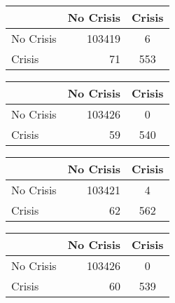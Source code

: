 \begin{table}
    \begin{center}
        \begin{subtable}[c]{0.4\textwidth}
            \begin{tabular}{lrc}
                \hline
                 & No Crisis & Crisis \\
                \hline
                No Crisis & 103419 & 6 \\
                Crisis & 71 & 553\\
                \hline
            \end{tabular}
            \label{tab:mat-conf-raw-1.1}
        \end{subtable}
        \hspace{1em}\vspace{1em}
        \begin{subtable}[c]{0.4\textwidth}
                \begin{tabular}{lrc}
                \hline
                 & No Crisis & Crisis \\
                \hline
                No Crisis & 103426 & 0 \\
                Crisis & 59 & 540\\
                \hline
            \end{tabular}
            \label{tab:mat-conf-stats-1.1}
        \end{subtable}
        
        \begin{subtable}[c]{0.4\textwidth}
            \begin{tabular}{lrc}
                \hline
                 & No Crisis & Crisis \\
                \hline
                No Crisis & 103421 & 4 \\
                Crisis & 62 & 562\\
                \hline
            \end{tabular}
            \label{tab:mat-conf-raw-1.2}
        \end{subtable}
        \hspace{1em}\vspace{1em}
        \begin{subtable}[c]{0.4\textwidth}
                \begin{tabular}{lrc}
                \hline
                 & No Crisis & Crisis \\
                \hline
                No Crisis & 103426 & 0 \\
                Crisis & 60 & 539\\
                \hline
            \end{tabular}
            \label{tab:mat-conf-stats-1.2}
        \end{subtable}
        

\end{center}
\end{table}

